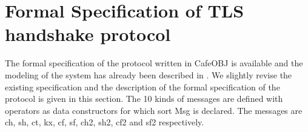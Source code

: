 \documentclass[a4paper,fleqn]{cas-dc}
\begin{document}
\section{Formal Specification of TLS handshake protocol} \label{fstls}
The formal specification of the protocol written in CafeOBJ is available and the modeling of the system has already been described in \cite{1437139}. We slightly revise the existing specification and the description of the formal specification of the protocol is given in this section. 
The 10 kinds of messages are defined with operators as data constructors for which sort Msg is declared. The messages are ch, sh, ct, kx, cf, sf, ch2, sh2, cf2 and sf2 respectively.
\end{document}
